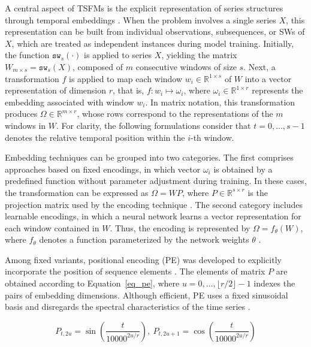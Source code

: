 \documentclass[final,3p,times,twocolumn,authoryear]{elsarticle}
\begin{document}
A central aspect of TSFMs is the explicit representation of series structures through temporal embeddings \citep{trirat_universal_2026}. When the problem involves a single series $X$, this representation can be built from individual observations, subsequences, or SWs of $X$, which are treated as independent instances during model training. Initially, the function $\texttt{sw}_s(\cdot)$ is applied to series $X$, yielding the matrix $W_{m \times s} = \texttt{sw}_s(X)$, composed of $m$ consecutive windows of size $s$. Next, a transformation $f$ is applied to map each window $w_i \in \mathbb{R}^{1\times s}$ of $W$ into a vector representation of dimension $r$, that is, $f : w_i \mapsto \omega_i$, where $\omega_i \in \mathbb{R}^{1\times r}$ represents the embedding associated with window $w_i$. In matrix notation, this transformation produces $\Omega \in \mathbb{R}^{m \times r}$, whose rows correspond to the representations of the $m$ windows in $W$. For clarity, the following formulations consider that $t = 0, \dots, s - 1$ denotes the relative temporal position within the $i$-th window.

Embedding techniques can be grouped into two categories. The first comprises approaches based on fixed encodings, in which vector $\omega_i$ is obtained by a predefined function without parameter adjustment during training. In these cases, the transformation can be expressed as $\Omega = WP$, where $P \in \mathbb{R}^{s\times r}$ is the projection matrix used by the encoding technique \citep{irani_positional_2026}. The second category includes learnable encodings, in which a neural network learns a vector representation for each window contained in $W$. Thus, the encoding is represented by $\Omega = f_{\theta}(W)$, where $f_{\theta}$ denotes a function parameterized by the network weights $\theta$ \citep{trirat_universal_2026}.

Among fixed variants, positional encoding (PE) was developed to explicitly incorporate the position of sequence elements \citep{vaswani_attention_2017}. The elements of matrix $P$ are obtained according to Equation~\ref{eq_pe}, where $u = 0, \ldots,\lfloor r/2 \rfloor - 1$ indexes the pairs of embedding dimensions. Although efficient, PE uses a fixed sinusoidal basis and disregards the spectral characteristics of the time series \citep{irani_positional_2026}.

\begin{equation}
\label{eq_pe}
P_{t,2u} = \sin\left(\frac{t}{10000^{2u/r}}\right), \: P_{t,2u+1} = \cos\left(\frac{t}{10000^{2u/r}}\right)
\end{equation}
\end{document}
